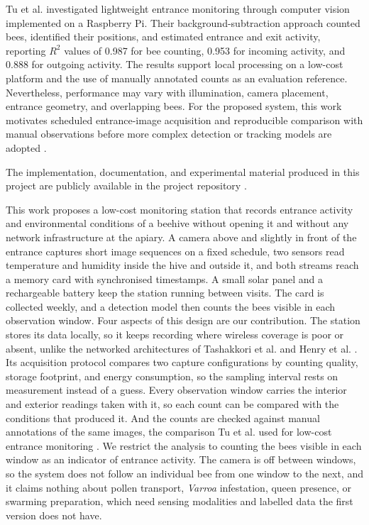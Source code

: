 \documentclass[english,hidelinks]{sbrt}
\begin{document}
Tu et al. investigated lightweight entrance monitoring through computer vision implemented on a Raspberry Pi. Their background-subtraction approach counted bees, identified their positions, and estimated entrance and exit activity, reporting $R^2$ values of 0.987 for bee counting, 0.953 for incoming activity, and 0.888 for outgoing activity. The results support local processing on a low-cost platform and the use of manually annotated counts as an evaluation reference. Nevertheless, performance may vary with illumination, camera placement, entrance geometry, and overlapping bees. For the proposed system, this work motivates scheduled entrance-image acquisition and reproducible comparison with manual observations before more complex detection or tracking models are adopted \cite{tu2016automatic}.

The implementation, documentation, and experimental material produced in this project are publicly available in the project repository \cite{repo}.

This work proposes a low-cost monitoring station that records entrance activity and environmental conditions of a beehive without opening it and without any network infrastructure at the apiary. A camera above and slightly in front of the entrance captures short image sequences on a fixed schedule, two sensors read temperature and humidity inside the hive and outside it, and both streams reach a memory card with synchronised timestamps. A small solar panel and a rechargeable battery keep the station running between visits. The card is collected weekly, and a detection model then counts the bees visible in each observation window. Four aspects of this design are our contribution. The station stores its data locally, so it keeps recording where wireless coverage is poor or absent, unlike the networked architectures of Tashakkori et al. and Henry et al. \cite{tashakkori2021beemon,henry2019precision}. Its acquisition protocol compares two capture configurations by counting quality, storage footprint, and energy consumption, so the sampling interval rests on measurement instead of a guess. Every observation window carries the interior and exterior readings taken with it, so each count can be compared with the conditions that produced it. And the counts are checked against manual annotations of the same images, the comparison Tu et al. used for low-cost entrance monitoring \cite{tu2016automatic}. We restrict the analysis to counting the bees visible in each window as an indicator of entrance activity. The camera is off between windows, so the system does not follow an individual bee from one window to the next, and it claims nothing about pollen transport, \textit{Varroa} infestation, queen presence, or swarming preparation, which need sensing modalities and labelled data the first version does not have.
\end{document}
